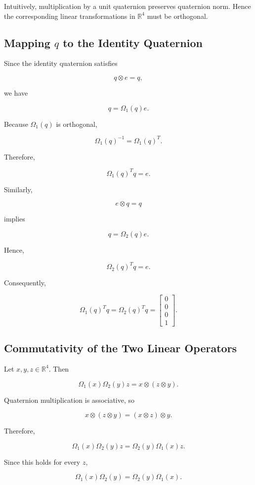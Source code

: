\documentclass[11pt,a4paper]{article}
\begin{document}
Intuitively, multiplication by a unit quaternion preserves quaternion
norm. Hence the corresponding linear transformations in
$\mathbb{R}^4$ must be orthogonal.

\subsection{Mapping $q$ to the Identity Quaternion}

Since the identity quaternion satisfies

\[
q\otimes e=q,
\]

we have

\[
q=\Omega_1(q)e.
\]

Because $\Omega_1(q)$ is orthogonal,

\[
\Omega_1(q)^{-1}
=
\Omega_1(q)^T.
\]

Therefore,

\[
\boxed{
\Omega_1(q)^Tq=e
}.
\]

Similarly,

\[
e\otimes q=q
\]

implies

\[
q=\Omega_2(q)e.
\]

Hence,

\[
\boxed{
\Omega_2(q)^Tq=e
}.
\]

Consequently,

\[
\boxed{
\Omega_1(q)^Tq
=
\Omega_2(q)^Tq
=
\begin{bmatrix}
0\\0\\0\\1
\end{bmatrix}
}.
\]

\subsection{Commutativity of the Two Linear Operators}

Let $x,y,z\in\mathbb{R}^4$. Then

\[
\Omega_1(x)\Omega_2(y)z
=
x\otimes(z\otimes y).
\]

Quaternion multiplication is associative, so

\[
x\otimes(z\otimes y)
=
(x\otimes z)\otimes y.
\]

Therefore,

\[
\Omega_1(x)\Omega_2(y)z
=
\Omega_2(y)\Omega_1(x)z.
\]

Since this holds for every $z$,

\[
\boxed{
\Omega_1(x)\Omega_2(y)
=
\Omega_2(y)\Omega_1(x)
}.
\]
\end{document}
